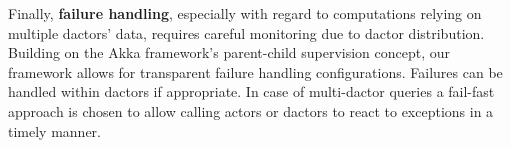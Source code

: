 Finally, \textbf{failure handling}, especially with regard to computations relying on multiple \glspl{dactor}' data, requires careful monitoring due to \gls{dactor} distribution.
Building on the Akka framework's parent-child supervision concept, our framework allows for transparent failure handling configurations.
Failures can be handled within \glspl{dactor} if appropriate.
In case of multi-\gls{dactor} queries a fail-fast approach is chosen to allow calling actors or \glspl{dactor} to react to exceptions in a timely manner.
